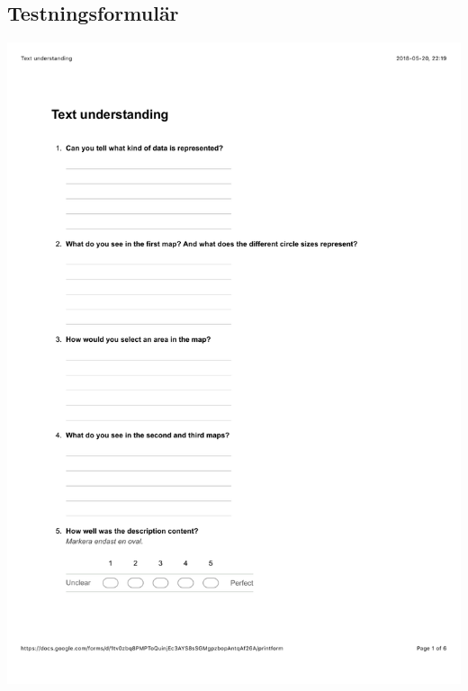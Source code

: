 \documentclass[12pt]{kththesis}
\begin{document}
\begin{appendices}
\section{Testningsformulär}
\includegraphics[width=1\textwidth]{TextUnderstanding1.pdf}

\end{appendices}
\end{document}
